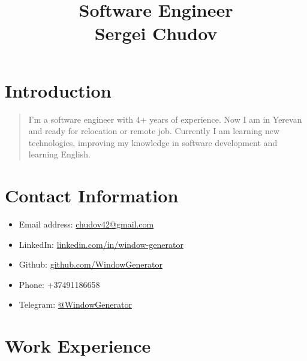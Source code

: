 \documentclass{article}
\begin{document}
\title{Software Engineer \\ \large Sergei Chudov}
\author{}
\date{}
\maketitle

\section*{Introduction}
\begin{quote}
I’m a software engineer with 4+ years of experience. Now I am in Yerevan and ready for relocation or remote job.
Currently I am learning new technologies, improving my knowledge in software development and learning English.
\end{quote}

\section*{Contact Information}
\begin{itemize}
    \item Email address: \href{mailto:chudov42@gmail.com}{chudov42@gmail.com}
    \item LinkedIn: \href{https://www.linkedin.com/in/window-generator}{linkedin.com/in/window-generator}
    \item Github: \href{https://github.com/WindowGenerator}{github.com/WindowGenerator}
    \item Phone: +37491186658
    \item Telegram: \href{https://t.me/WidowGenerator}{@WindowGenerator}
\end{itemize}

\section*{Work Experience}
\end{document}
